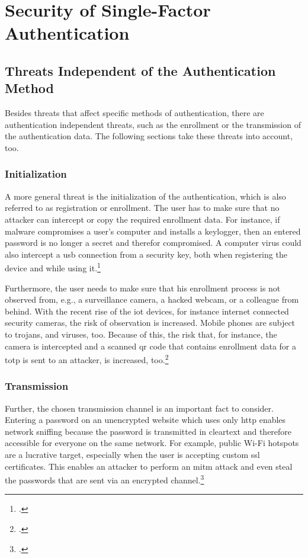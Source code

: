 \chapter{Security of Single-Factor Authentication}
\label{chap:one-factor-security}

\section{Threats Independent of the Authentication Method}

Besides threats that affect specific methods of authentication, there are authentication independent threats, such as the enrollment or the transmission of the authentication data. The following sections take these threats into account, too.

\subsection{Initialization}

A more general threat is the initialization  of the authentication, which is also referred to as registration or enrollment. The user has to make sure that no attacker can intercept or copy the required enrollment data. For instance, if malware compromises a user’s computer and installs a keylogger, then an entered password is no longer a secret and therefor compromised. A computer virus could also intercept a \gls{usb} connection from a security key, both when registering the device and while using it.\footcites[See][61]{Ulqinaku:2019:FPP:3317549.3323404}

Furthermore, the user needs to make sure that his enrollment process is not observed from, e.g., a surveillance camera, a hacked webcam, or a colleague from behind. With the recent rise of the \gls{iot} devices, for instance internet connected security cameras, the risk of observation is increased. Mobile phones are subject to trojans, and viruses, too. Because of this, the risk that, for instance, the camera is intercepted and a scanned \gls{qr} code that contains enrollment data for a \gls{totp} is sent to an attacker, is increased, too.\footcites[See][152--153]{10.1007/978-3-642-39235-1_9}[See][371--375]{10.1007/978-3-662-45472-5_24}

\subsection{Transmission}

Further, the chosen transmission channel is an important fact to consider. Entering a password on an unencrypted website which uses only \gls{http} enables network sniffing because the password is transmitted in cleartext and therefore accessible for everyone on the same network. For example, public Wi-Fi hotspots are a lucrative target, especially when the user is accepting custom \gls{ssl} certificates. This enables an attacker to perform an \gls{mitm} attack and even steal the passwords that are sent via an encrypted channel.\footcites[See][518]{10.1007/978-3-030-21548-4_28}

